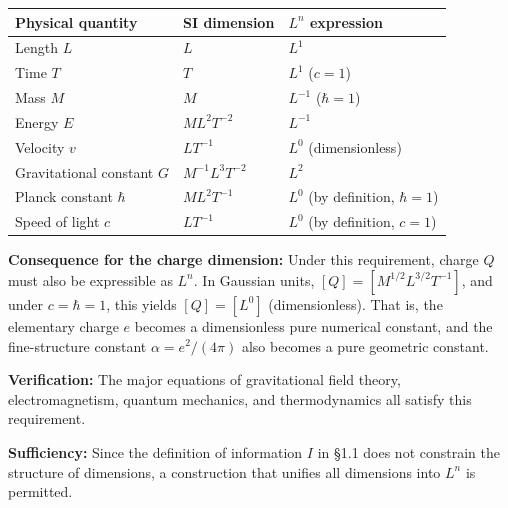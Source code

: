 \documentclass[a4paper,11pt]{article}
\begin{document}
{\def\LTcaptype{none} %
\begin{longtable}[]{@{}
  >{\raggedright\arraybackslash}p{}
  >{\raggedright\arraybackslash}p{}
  >{\raggedright\arraybackslash}p{}@{}}
\toprule\noalign{}
\begin{minipage}[b]{\linewidth}\raggedright
Physical quantity
\end{minipage} & \begin{minipage}[b]{\linewidth}\raggedright
SI dimension
\end{minipage} & \begin{minipage}[b]{\linewidth}\raggedright
\(L^n\) expression
\end{minipage} \\
\midrule\noalign{}
\endhead
\bottomrule\noalign{}
\endlastfoot
Length \(L\) & \(L\) & \(L^1\) \\
Time \(T\) & \(T\) & \(L^1\) (\(c = 1\)) \\
Mass \(M\) & \(M\) & \(L^{-1}\) (\(\hbar = 1\)) \\
Energy \(E\) & \(ML^2T^{-2}\) & \(L^{-1}\) \\
Velocity \(v\) & \(LT^{-1}\) & \(L^0\) (dimensionless) \\
Gravitational constant \(G\) & \(M^{-1}L^3T^{-2}\) & \(L^2\) \\
Planck constant \(\hbar\) & \(ML^2T^{-1}\) & \(L^0\) (by definition,
\(\hbar = 1\)) \\
Speed of light \(c\) & \(LT^{-1}\) & \(L^0\) (by definition,
\(c = 1\)) \\
\end{longtable}
}

\textbf{Consequence for the charge dimension:} Under this requirement,
charge \(Q\) must also be expressible as \(L^n\). In Gaussian units,
\([Q] = [M^{1/2}L^{3/2}T^{-1}]\), and under \(c = \hbar = 1\), this
yields \([Q] = [L^0]\) (dimensionless). That is, the elementary charge
\(e\) becomes a dimensionless pure numerical constant, and the
fine-structure constant \(\alpha = e^2/(4\pi)\) also becomes a pure
geometric constant.

\textbf{Verification:} The major equations of gravitational field
theory, electromagnetism, quantum mechanics, and thermodynamics all
satisfy this requirement.

\textbf{Sufficiency:} Since the definition of information \(I\) in §1.1
does not constrain the structure of dimensions, a construction that
unifies all dimensions into \(L^n\) is permitted.
\end{document}
